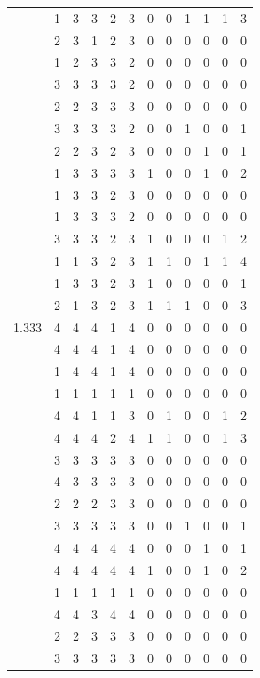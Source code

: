 \documentclass[]{book}
\theoremstyle{definition}
\theoremstyle{definition}
\theoremstyle{definition}
\theoremstyle{remark}
\begin{document}
\begin{table}
{\begin{tabular}[t]{rrrrrrrrrrrr}
 & 1 & 3 & 3 & 2 & 3 & 0 & 0 & 1 & 1 & 1 & 3\\
 & 2 & 3 & 1 & 2 & 3 & 0 & 0 & 0 & 0 & 0 & 0\\
 & 1 & 2 & 3 & 3 & 2 & 0 & 0 & 0 & 0 & 0 & 0\\
 & 3 & 3 & 3 & 3 & 2 & 0 & 0 & 0 & 0 & 0 & 0\\
 & 2 & 2 & 3 & 3 & 3 & 0 & 0 & 0 & 0 & 0 & 0\\
 & 3 & 3 & 3 & 3 & 2 & 0 & 0 & 1 & 0 & 0 & 1\\
 & 2 & 2 & 3 & 2 & 3 & 0 & 0 & 0 & 1 & 0 & 1\\
 & 1 & 3 & 3 & 3 & 3 & 1 & 0 & 0 & 1 & 0 & 2\\
 & 1 & 3 & 3 & 2 & 3 & 0 & 0 & 0 & 0 & 0 & 0\\
 & 1 & 3 & 3 & 3 & 2 & 0 & 0 & 0 & 0 & 0 & 0\\
 & 3 & 3 & 3 & 2 & 3 & 1 & 0 & 0 & 0 & 1 & 2\\
 & 1 & 1 & 3 & 2 & 3 & 1 & 1 & 0 & 1 & 1 & 4\\
 & 1 & 3 & 3 & 2 & 3 & 1 & 0 & 0 & 0 & 0 & 1\\
 & 2 & 1 & 3 & 2 & 3 & 1 & 1 & 1 & 0 & 0 & 3\\
1.333 & 4 & 4 & 4 & 1 & 4 & 0 & 0 & 0 & 0 & 0 & 0\\
 & 4 & 4 & 4 & 1 & 4 & 0 & 0 & 0 & 0 & 0 & 0\\
 & 1 & 4 & 4 & 1 & 4 & 0 & 0 & 0 & 0 & 0 & 0\\
 & 1 & 1 & 1 & 1 & 1 & 0 & 0 & 0 & 0 & 0 & 0\\
 & 4 & 4 & 1 & 1 & 3 & 0 & 1 & 0 & 0 & 1 & 2\\
 & 4 & 4 & 4 & 2 & 4 & 1 & 1 & 0 & 0 & 1 & 3\\
 & 3 & 3 & 3 & 3 & 3 & 0 & 0 & 0 & 0 & 0 & 0\\
 & 4 & 3 & 3 & 3 & 3 & 0 & 0 & 0 & 0 & 0 & 0\\
 & 2 & 2 & 2 & 3 & 3 & 0 & 0 & 0 & 0 & 0 & 0\\
 & 3 & 3 & 3 & 3 & 3 & 0 & 0 & 1 & 0 & 0 & 1\\
 & 4 & 4 & 4 & 4 & 4 & 0 & 0 & 0 & 1 & 0 & 1\\
 & 4 & 4 & 4 & 4 & 4 & 1 & 0 & 0 & 1 & 0 & 2\\
 & 1 & 1 & 1 & 1 & 1 & 0 & 0 & 0 & 0 & 0 & 0\\
 & 4 & 4 & 3 & 4 & 4 & 0 & 0 & 0 & 0 & 0 & 0\\
 & 2 & 2 & 3 & 3 & 3 & 0 & 0 & 0 & 0 & 0 & 0\\
 & 3 & 3 & 3 & 3 & 3 & 0 & 0 & 0 & 0 & 0 & 0\\

\end{tabular}}
\end{table}
\end{document}
